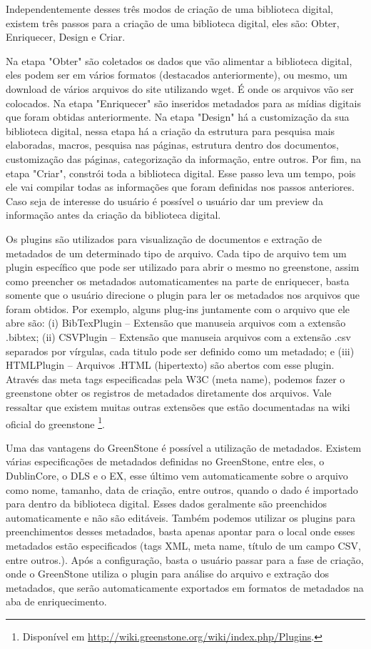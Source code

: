 Independentemente desses três modos de criação de uma biblioteca digital, existem três passos para a criação de uma biblioteca digital, eles são: Obter, Enriquecer, Design e Criar.

Na etapa "Obter" são coletados os dados que vão alimentar a biblioteca digital, eles podem ser em vários formatos (destacados anteriormente), ou mesmo, um download de vários arquivos do site utilizando wget. É onde os arquivos vão ser colocados. Na etapa "Enriquecer" são inseridos metadados para as mídias digitais que foram obtidas anteriormente. Na etapa "Design" há a customização da sua biblioteca digital, nessa etapa há a criação da estrutura para pesquisa mais elaboradas, macros, pesquisa nas páginas, estrutura dentro dos documentos, customização das páginas, categorização da informação, entre outros. Por fim, na etapa "Criar", constrói toda a biblioteca digital. Esse passo leva um tempo, pois ele vai compilar todas as informações que foram definidas nos passos anteriores. Caso seja de interesse do usuário é possível o usuário dar um preview da informação antes da criação da biblioteca digital.

Os plugins são utilizados para visualização de documentos e extração de metadados de um determinado tipo de arquivo. Cada tipo de arquivo tem um plugin específico que pode ser utilizado para abrir o mesmo no greenstone, assim como preencher os metadados automaticamentes na parte de enriquecer, basta somente que o usuário direcione o plugin para ler os metadados nos arquivos que foram obtidos. Por exemplo, alguns plug-ins juntamente com o arquivo que ele abre são: (i) BibTexPlugin – Extensão que manuseia arquivos com a extensão .bibtex; (ii) CSVPlugin – Extensão que manuseia arquivos com a extensão .csv separados por vírgulas, cada titulo pode ser definido como um metadado; e (iii) HTMLPlugin – Arquivos .HTML (hipertexto) são abertos com esse plugin. Através das meta tags especificadas pela W3C (meta name), podemos fazer o greenstone obter os registros de metadados diretamente dos arquivos. Vale ressaltar que existem muitas outras extensões que estão documentadas na wiki oficial do greenstone \footnote{Disponível em \url{http://wiki.greenstone.org/wiki/index.php/Plugins}.}.

Uma das vantagens do GreenStone é possível a utilização de metadados. Existem várias especificações de metadados definidas no GreenStone, entre eles, o DublinCore, o DLS e o EX, esse último vem automaticamente sobre o arquivo como nome, tamanho, data de criação, entre outros, quando o dado é importado para dentro da biblioteca digital. Esses dados geralmente são preenchidos automaticamente e não são editáveis. Também podemos utilizar os plugins para preenchimentos desses metadados, basta apenas apontar para o local onde esses metadados estão especificados (tags XML, meta name, título de um campo CSV, entre outros.). Após a configuração, basta o usuário passar para a fase de criação, onde o GreenStone utiliza o plugin para análise do arquivo e extração dos metadados, que serão automaticamente exportados em formatos de metadados na aba de enriquecimento.

